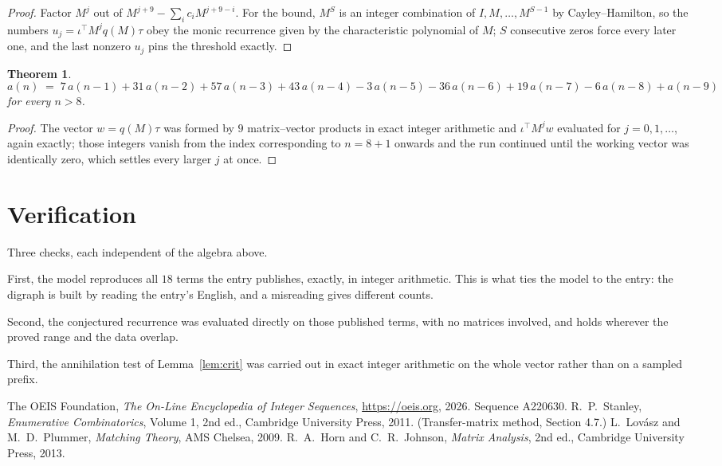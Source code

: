 \documentclass[11pt,a4paper]{article}
\theoremstyle{plain}
\newtheorem{theorem}{Theorem}
\theoremstyle{definition}
\begin{document}
\begin{proof}
Factor $M^{j}$ out of $M^{j+9}-\sum_ic_iM^{j+9-i}$. For the bound, $M^{S}$
is an integer combination of $I,M,\dots,M^{S-1}$ by Cayley--Hamilton, so the numbers
$u_j=\iota^{\!\top}M^{j}q(M)\tau$ obey the monic recurrence given by the characteristic
polynomial of $M$; $S$ consecutive zeros force every later one, and the last nonzero $u_j$
pins the threshold exactly.
\end{proof}

\begin{theorem}
\[
a(n)\;=\;7\,a(n-1) + 31\,a(n-2) + 57\,a(n-3) + 43\,a(n-4) - 3\,a(n-5) - 36\,a(n-6) + 19\,a(n-7) - 6\,a(n-8) + a(n-9)
\]
for every $n>8$.
\end{theorem}

\begin{proof}
The vector $w=q(M)\tau$ was formed by $9$ matrix--vector products in exact integer
arithmetic and $\iota^{\!\top}M^{j}w$ evaluated for $j=0,1,\dots$, again exactly; those
integers vanish from the index corresponding to $n=8+1$ onwards and the run continued
until the working vector was identically zero, which settles every larger $j$ at once.
\end{proof}

\section{Verification}

Three checks, each independent of the algebra above.

First, the model reproduces all $18$ terms the entry publishes, exactly, in integer
arithmetic. This is what ties the model to the entry: the digraph is built by reading the
entry's English, and a misreading gives different counts.

Second, the conjectured recurrence was evaluated directly on those published terms, with no
matrices involved, and holds wherever the proved range and the data overlap.

Third, the annihilation test of Lemma~\ref{lem:crit} was carried out in exact integer
arithmetic on the whole vector rather than on a sampled prefix.

\begin{thebibliography}{9}
 The OEIS Foundation, \emph{The On-Line Encyclopedia of Integer
Sequences}, \url{https://oeis.org}, 2026. Sequence A220630.
 R.~P.~Stanley, \emph{Enumerative Combinatorics}, Volume 1, 2nd ed.,
Cambridge University Press, 2011. (Transfer-matrix method, Section 4.7.)
 L.~Lov\'asz and M.~D.~Plummer, \emph{Matching Theory}, AMS Chelsea,
2009.
 R.~A.~Horn and C.~R.~Johnson, \emph{Matrix Analysis}, 2nd ed., Cambridge
University Press, 2013.
\end{thebibliography}
\end{document}
